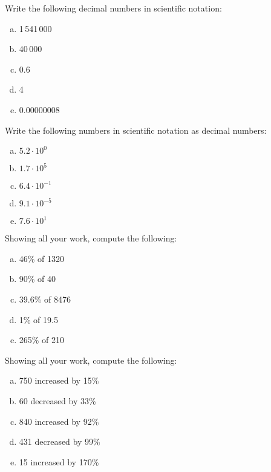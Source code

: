 \documentclass[11pt,letterpaper]{article}
\begin{document}

 Write the following decimal numbers in scientific notation:
	\begin{enumerate}[(a)]
	\item 1\,541\,000
	\item 40\,000
	\item 0.6
	\item 4
	\item 0.00000008
	\end{enumerate}



\newpage



 Write the following numbers in scientific notation as decimal numbers:
	\begin{enumerate}[(a)]
	\item $5.2 \cdot 10^0$
	\item $1.7 \cdot 10^5$
	\item $6.4 \cdot 10^{-1}$
	\item $9.1 \cdot 10^{-5}$
	\item $7.6 \cdot 10^1$
	\end{enumerate}



\newpage



 Showing all your work, compute the following:
	\begin{enumerate}[(a)]
	\item 46\% of 1320
	\item 90\% of 40
	\item 39.6\% of 8476
	\item 1\% of 19.5
	\item 265\% of 210
	\end{enumerate}



\newpage



 Showing all your work, compute the following:
	\begin{enumerate}[(a)]
	\item 750 increased by 15\%
	\item 60 decreased by 33\%
	\item 840 increased by 92\%
	\item 431 decreased by 99\%
	\item 15 increased by 170\%
	\end{enumerate}
\end{document}
